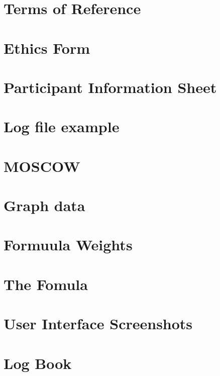 \chapter{Terms of Reference}
\chapter{Ethics Form}

\chapter{Participant Information Sheet}

\chapter{Log file example} \label{Log file example}

\chapter{MOSCOW} \label{Moscow}

\chapter{Graph data} \label{Graph data}

\chapter{Formuula Weights}

\chapter{The Fomula} \label{code}

\chapter{User Interface Screenshots} \label{User Interface Screenshots}

\chapter{Log Book}
